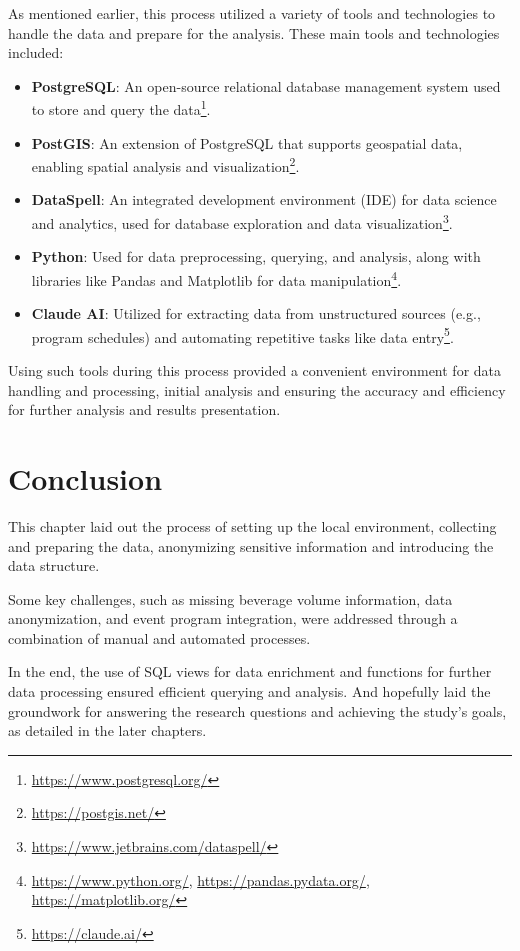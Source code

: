 As mentioned earlier, this process utilized a variety of tools and technologies to handle the data and prepare for the analysis.
These main tools and technologies included:
\begin{itemize}
	\item \textbf{PostgreSQL}: An open-source relational database management system used to store and query the data\footnote{\url{https://www.postgresql.org/}}.
	\item \textbf{PostGIS}: An extension of PostgreSQL that supports geospatial data, enabling spatial analysis and visualization\footnote{\url{https://postgis.net/}}.
	\item \textbf{DataSpell}: An integrated development environment (IDE) for data science and analytics, used for database exploration and data visualization\footnote{\url{https://www.jetbrains.com/dataspell/}}.
	\item \textbf{Python}: Used for data preprocessing, querying, and analysis, along with libraries like Pandas and Matplotlib for data manipulation\footnote{\url{https://www.python.org/}, \url{https://pandas.pydata.org/}, \url{https://matplotlib.org/}}.
	\item \textbf{Claude AI}: Utilized for extracting data from unstructured sources (e.g., program schedules) and automating repetitive tasks like data entry\footnote{\url{https://claude.ai/}}.
\end{itemize}

Using such tools during this process provided a convenient environment for data handling and processing, initial analysis and ensuring the accuracy and efficiency for further analysis and results presentation.


\section{Conclusion}
\label{sec:data-methodology-conclusion}
This chapter laid out the process of setting up the local environment, collecting and preparing the data, anonymizing sensitive information and introducing the data structure.

Some key challenges, such as missing beverage volume information, data anonymization, and event program integration, were addressed through a combination of manual and automated processes.

In the end, the use of SQL views for data enrichment and functions for further data processing ensured efficient querying and analysis.
And hopefully laid the groundwork for answering the research questions and achieving the study's goals, as detailed in the later chapters.

